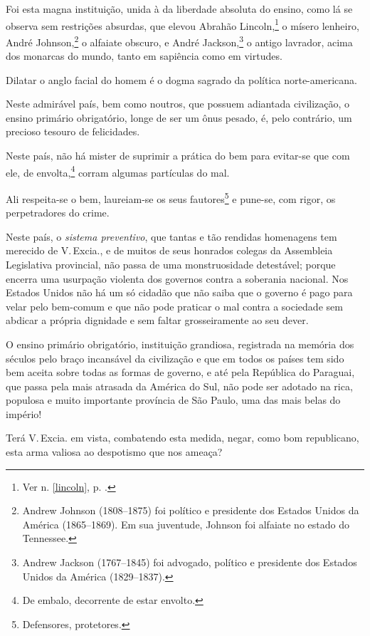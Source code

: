Foi esta magna instituição, unida à da liberdade absoluta do ensino,
como lá se observa sem restrições absurdas, que elevou Abrahão
Lincoln,\footnote{Ver n. \ref{lincoln}, p. \pageref{lincoln}.} o mísero 
lenheiro, André Johnson,\footnote{Andrew Johnson (1808--1875) foi político 
e presidente dos Estados Unidos da América (1865--1869). Em sua juventude, 
Johnson foi alfaiate no estado do Tennessee.} o alfaiate obscuro, e André
Jackson,\footnote{Andrew Jackson (1767--1845) foi advogado, político e
  presidente dos Estados Unidos da América (1829--1837).} o antigo
lavrador, acima dos monarcas do mundo, tanto em sapiência como em
virtudes.

Dilatar o anglo facial do homem é o dogma sagrado da política
norte-americana.

Neste admirável país, bem como noutros, que possuem adiantada
civilização, o ensino primário obrigatório, longe de ser um ônus pesado,
é, pelo contrário, um precioso tesouro de felicidades.

Neste país, não há mister de suprimir a prática do bem para evitar-se
que com ele, de envolta,\footnote{De embalo, decorrente de estar
  envolto.} corram algumas partículas do mal.

Ali respeita-se o bem, laureiam-se os seus fautores\footnote{
  Defensores, protetores.} e pune-se, com rigor, os perpetradores do
crime.

Neste país, o \emph{sistema preventivo}, que tantas e tão rendidas
homenagens tem merecido de V.\,Excia., e de muitos de seus honrados
colegas da Assembleia Legislativa provincial, não passa de uma
monstruosidade detestável; porque encerra uma usurpação violenta dos
governos contra a soberania nacional. Nos Estados Unidos não há um só
cidadão que não saiba que o governo é pago para velar pelo bem-comum e
que não pode praticar o mal contra a sociedade sem abdicar a própria
dignidade e sem faltar grosseiramente ao seu dever.

O ensino primário obrigatório, instituição grandiosa, registrada na
memória dos séculos pelo braço incansável da civilização e que em todos
os países tem sido bem aceita sobre todas as formas de governo, e até
pela República do Paraguai, que passa pela mais atrasada da América do
Sul, não pode ser adotado na rica, populosa e muito importante província
de São Paulo, uma das mais belas do império!

Terá V.\,Excia. em vista, combatendo esta medida, negar, como bom
republicano, esta arma valiosa ao despotismo que nos ameaça?


